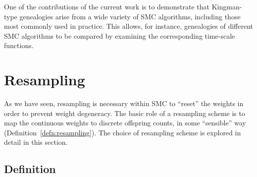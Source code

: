 One of the contributions of the current work is to demonstrate that Kingman-type genealogies arise from a wide variety of SMC algorithms, including those most commonly used in practice.
This allows, for instance, genealogies of different SMC algorithms to be compared by examining the corresponding time-scale functions.





\section{Resampling \seb{$\sim$} }
\label{sec:resampling}
As we have seen, resampling is necessary within SMC to ``reset'' the weights in order to prevent weight degeneracy.
The basic role of a resampling scheme is to map the continuous weights to discrete offspring counts, in some ``sensible'' way (Definition~\ref{defn:resampling}).
The choice of resampling scheme is explored in detail in this section.

\subsection{Definition \seb{$\checkmark$} }

